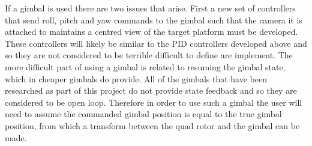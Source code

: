 \documentclass[11pt, twocolumn]{article}
\begin{document}
If a gimbal is used there are two issues that arise. First a new set of controllers that send roll, pitch and yaw commands to the gimbal such that the camera it is attached to maintains a centred view of the target platform must be developed. These controllers will likely be similar to the PID controllers developed above and so they are not considered to be terrible difficult to define are implement. The more difficult part of using a gimbal is related to resuming the gimbal state, which in cheaper gimbals do provide. All of the gimbals that have been researched as part of this project do not provide state feedback and so they are considered to be open loop. Therefore in order to use such a gimbal the user will need to assume the commanded gimbal position is equal to the true gimbal position, from which a transform between the quad rotor and the gimbal can be made.








{}

\end{document}
